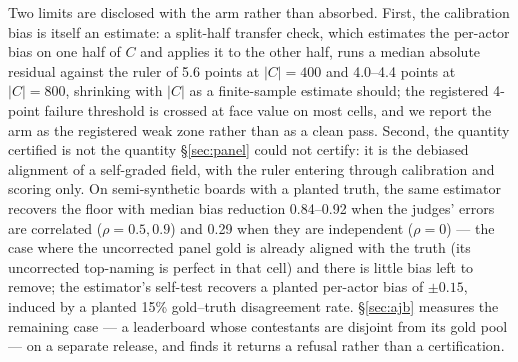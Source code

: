 \documentclass{article}
\newcommand{\ids}[1]{\texttt{\small #1}} %
\begin{document}
Two limits are disclosed with the arm rather than absorbed. First, the calibration
bias is itself an estimate: a split-half transfer check, which estimates the
per-actor bias on one half of $C$ and applies it to the other half, runs a median
absolute residual against the ruler of 5.6 points at $|C|=400$ and 4.0--4.4 points
at $|C|=800$, shrinking with $|C|$ as a finite-sample estimate should; the
registered 4-point failure threshold is crossed at face value on most cells, and we
report the arm as the registered weak zone rather than as a clean pass. Second, the
quantity certified is not the quantity \S\ref{sec:panel} could not certify: it is
the debiased alignment of a self-graded field, with the ruler entering through
calibration and scoring only. On semi-synthetic boards with a planted truth, the
same estimator recovers the floor with median bias reduction 0.84--0.92 when the
judges' errors are correlated ($\rho = 0.5, 0.9$) and 0.29 when they are
independent ($\rho = 0$) --- the case where the uncorrected panel gold is already
aligned with the truth (its uncorrected top-naming is perfect in that cell) and
there is little bias left to remove; the estimator's self-test recovers a planted
per-actor bias of $\pm 0.15$, induced by a planted 15\% gold--truth disagreement
rate. \S\ref{sec:ajb} measures the remaining case --- a leaderboard whose contestants are disjoint from its gold
pool --- on a separate release, and finds it returns a refusal rather than a certification.

\begin{table}[htbp]
\centering\small

\caption{The calibrated-floor arm on the released panel. Each row is a cell of the
preregistered grid ($m$ judges, $k$ contestants, calibration size $|C|$; 200
resampled boards; $\delta=0.05$); the first row is the preregistered primary cell.
True marg.\ is the measured external-ruler margin between the best contestant and
the best judge, in points; $\hat\Delta$ its debiased estimate. Certified is the
share of boards the corrected rule certifies; FCR the share of certified boards
naming the wrong external top (Wilson 95\%); AUC the board-level separation of
correct top-naming by estimated margin (bootstrap 95\%); uncorr.\ top the
uncorrected rule's share of boards whose raw top equals the external top (its
certification share is zero in every cell). Regenerated from
\ids{evidence/calibrated/summary\_ci.json}, recomputed from the per-board carrier
by \ids{make\_calibrated\_summary.py}; the raw boards are
\ids{evidence/calibrated/e2\_truthfulqa\_boards.csv}.}
\label{tab:calibrated}
\end{table}
\end{document}
